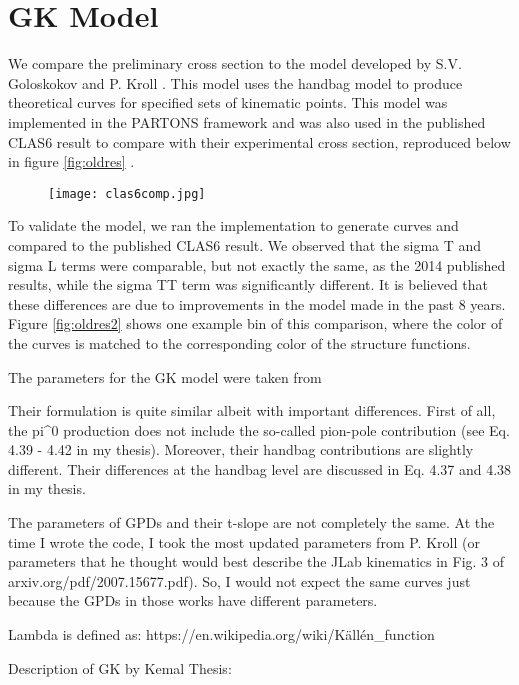 \section{GK Model}

We compare the preliminary cross section to the model developed by S.V. Goloskokov and P. Kroll \cite{Goloskokov2010}. This model uses the handbag model to produce theoretical curves for specified sets of kinematic points. This model was implemented in the PARTONS framework \cite{Berthou2018} and was also used in the published CLAS6 result to compare with their experimental cross section, reproduced below in figure \ref{fig:oldres} \cite{Bedlinskiy2014}.

\begin{figure}[hbt]
	\centering
	\texttt{[image: clas6comp.jpg]}
\end{figure}\label{fig:oldres}

To validate the model, we ran the implementation to generate curves and compared to the published CLAS6 result. We observed that the sigma T and sigma L terms were comparable, but not exactly the same, as the 2014 published results, while the sigma TT term was significantly different. It is believed that these differences are due to improvements in the model made in the past 8 years. Figure \ref{fig:oldres2} shows one example bin of this comparison, where the color of the curves is matched to the corresponding color of the structure functions.


The parameters for the GK model were taken from 

Their formulation is quite similar albeit with important differences. First of all, the pi^0 production does not include the so-called pion-pole contribution (see Eq. 4.39 - 4.42 in my thesis). Moreover, their handbag contributions are slightly different. Their differences at the handbag level are discussed in Eq. 4.37 and 4.38 in my thesis. 

The parameters of GPDs and their t-slope are not completely the same. At the time I wrote the code, I took the most updated parameters from P. Kroll (or parameters that he thought would best describe the JLab kinematics in Fig. 3 of arxiv.org/pdf/2007.15677.pdf). So, I would not expect the same curves just because the GPDs in those works have different parameters. 

Lambda is defined as: https://en.wikipedia.org/wiki/Källén_function

Description of GK by Kemal Thesis:


